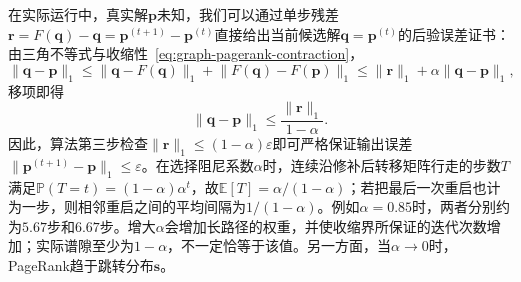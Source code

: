 在实际运行中，真实解$\bm p$未知，我们可以通过单步残差$\bm r=F(\bm q)-\bm q=\bm p^{(t+1)}-\bm p^{(t)}$直接给出当前候选解$\bm q=\bm p^{(t)}$的后验误差证书：由三角不等式与收缩性~\eqref{eq:graph-pagerank-contraction}，
\[
\lVert\bm{q}-\bm{p}\rVert_1
\le\lVert\bm{q}-F(\bm{q})\rVert_1+\lVert F(\bm{q})-F(\bm{p})\rVert_1
\le\lVert\bm{r}\rVert_1+\alpha\lVert\bm{q}-\bm{p}\rVert_1,
\]
移项即得
\begin{equation}
\lVert\bm{q}-\bm{p}\rVert_1\le\frac{\lVert\bm{r}\rVert_1}{1-\alpha}.
\label{eq:graph-pagerank-residual-bound}
\end{equation}
因此，算法第三步检查$\lVert\bm r\rVert_1\leq(1-\alpha)\varepsilon$即可严格保证输出误差$\lVert\bm p^{(t+1)}-\bm p\rVert_1\leq\varepsilon$。在选择阻尼系数$\alpha$时，连续沿修补后转移矩阵行走的步数$T$满足$\mathbb P(T=t)=(1-\alpha)\alpha^t$，故$\mathbb E[T]=\alpha/(1-\alpha)$；若把最后一次重启也计为一步，则相邻重启之间的平均间隔为$1/(1-\alpha)$。例如$\alpha=0.85$时，两者分别约为$5.67$步和$6.67$步。增大$\alpha$会增加长路径的权重，并使收缩界所保证的迭代次数增加；实际谱隙至少为$1-\alpha$，不一定恰等于该值。另一方面，当$\alpha\to0$时，PageRank趋于跳转分布$\bm s$。
